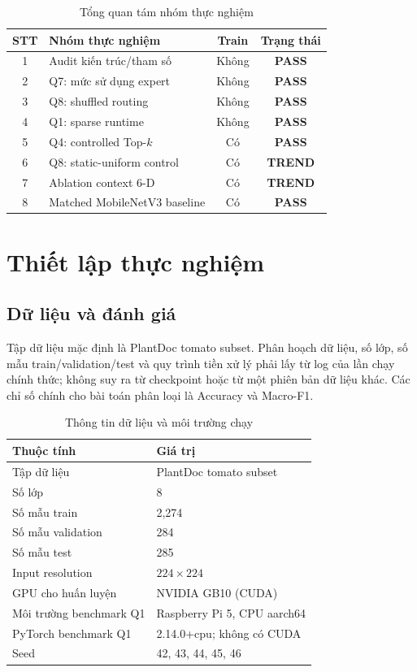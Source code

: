 \documentclass[conference]{IEEEtran}
\begin{document}
\begin{table}[H]
\caption{Tổng quan tám nhóm thực nghiệm}
\label{tab:overview}
\centering
\footnotesize
\begin{tabular}{@{}clcc@{}}
\toprule
STT & Nhóm thực nghiệm & Train & Trạng thái \\
\midrule
1 & Audit kiến trúc/tham số & Không & \textbf{PASS} \\
2 & Q7: mức sử dụng expert & Không & \textbf{PASS} \\
3 & Q8: shuffled routing & Không & \textbf{PASS} \\
4 & Q1: sparse runtime & Không & \textbf{PASS} \\
5 & Q4: controlled Top-$k$ & Có & \textbf{PASS} \\
6 & Q8: static-uniform control & Có & \textbf{TREND} \\
7 & Ablation context 6-D & Có & \textbf{TREND} \\
8 & Matched MobileNetV3 baseline & Có & \textbf{PASS} \\
\bottomrule
\end{tabular}
\end{table}

\section{Thiết lập thực nghiệm}

\subsection{Dữ liệu và đánh giá}

Tập dữ liệu mặc định là PlantDoc tomato subset. Phân hoạch dữ liệu, số lớp,
số mẫu train/validation/test và quy trình tiền xử lý phải lấy từ log của lần
chạy chính thức; không suy ra từ checkpoint hoặc từ một phiên bản dữ liệu
khác. Các chỉ số chính cho bài toán phân loại là Accuracy và Macro-F1.

\begin{table}[H]
\caption{Thông tin dữ liệu và môi trường chạy}
\label{tab:setup}
\centering
\footnotesize
\begin{tabular}{@{}p{}p{}@{}}
\toprule
Thuộc tính & Giá trị \\
\midrule
Tập dữ liệu & PlantDoc tomato subset \\
Số lớp & 8 \\
Số mẫu train & 2,274 \\
Số mẫu validation & 284 \\
Số mẫu test & 285 \\
Input resolution & $224\times224$ \\
GPU cho huấn luyện & NVIDIA GB10 (CUDA) \\
Môi trường benchmark Q1 & Raspberry Pi 5, CPU aarch64 \\
PyTorch benchmark Q1 & 2.14.0+cpu; không có CUDA \\
Seed & 42, 43, 44, 45, 46 \\
\bottomrule
\end{tabular}
\end{table}
\end{document}
